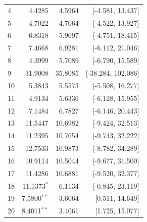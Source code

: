 \begin{longtable}{lrrr}
4 & 4.4285 & 4.5964 & [-4.581, 13.437] \\
5 & 4.7022 & 4.7064 & [-4.522, 13.927] \\
6 & 6.8318 & 5.9097 & [-4.751, 18.415] \\
7 & 7.4668 & 6.9281 & [-6.112, 21.046] \\
8 & 4.3999 & 5.7089 & [-6.790, 15.589] \\
9 & 31.9008 & 35.8085 & [-38.284, 102.086] \\
10 & 5.3843 & 5.5573 & [-5.508, 16.277] \\
11 & 4.9134 & 5.6336 & [-6.128, 15.955] \\
12 & 7.1484 & 6.7827 & [-6.146, 20.443] \\
13 & 11.5447 & 10.6982 & [-9.424, 32.513] \\
14 & 11.2395 & 10.7054 & [-9.743, 32.222] \\
15 & 12.7533 & 10.9873 & [-8.782, 34.289] \\
16 & 10.9114 & 10.5044 & [-9.677, 31.500] \\
17 & 11.4286 & 10.6881 & [-9.520, 32.377] \\
18 & 11.1373$^{*}$ & 6.1134 & [-0.845, 23.119] \\
19 & 7.5800$^{**}$ & 3.6064 & [0.511, 14.649] \\
20 & 8.4011$^{**}$ & 3.4061 & [1.725, 15.077] \\
\end{longtable}
